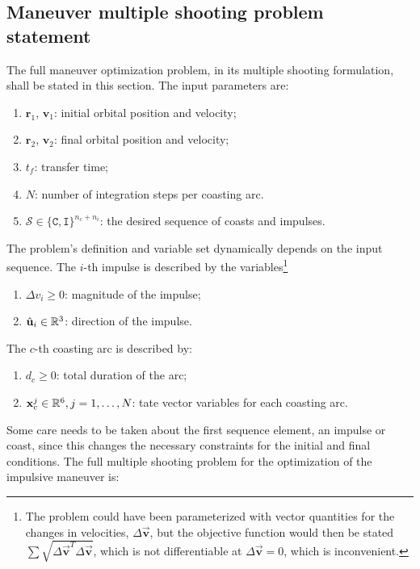\subsection{Maneuver multiple shooting problem statement}

The full maneuver optimization problem, in its multiple shooting formulation, shall be stated in this section. The input parameters are:
\begin{enumerate}
    \item \(\mathbf{r}_1\), \(\mathbf{v}_1\): initial orbital position and velocity;
    \item \(\mathbf{r}_2\), \(\mathbf{v}_2\): final orbital position and velocity;
    \item \(t_f\): transfer time;
    \item \(N\): number of integration steps per coasting arc.
    \item \(\mathcal{S} \in \{\texttt{C}, \texttt{I}\}^{n_c + n_i}\): the desired sequence of coasts and impulses.
\end{enumerate}

The problem's definition and variable set dynamically depends on the input sequence. The \(i\)-th impulse is described by the variables\footnote{The problem could have been parameterized with vector quantities for the changes in velocities, \(\Delta \vec{\mathbf{v}}\), but the objective function would then be stated \(\sum \sqrt{\Delta \vec{\mathbf{v}}^T \Delta \vec{\mathbf{v}}}\), which is not differentiable at \(\Delta \vec {\mathbf{v}} = 0\), which is inconvenient.}
\begin{enumerate}
    \item \(\Delta v_i \geq 0\): magnitude of the impulse;
    \item \(\hat{\mathbf{u}}_i \in \mathbb{R}^3\): direction of the impulse.
\end{enumerate}

The \(c\)-th coasting arc is described by:
\begin{enumerate}
    \item \(d_c \geq 0\): total duration of the arc;
    \item \(\mathbf{x}^j_c \in \mathbb{R}^6, j=1,\dots,N\): tate vector variables for each coasting arc. 
\end{enumerate}

Some care needs to be taken about the first sequence element, an impulse or coast, since this changes the necessary constraints for the initial and final conditions. The full multiple shooting problem for the optimization of the impulsive maneuver is:

